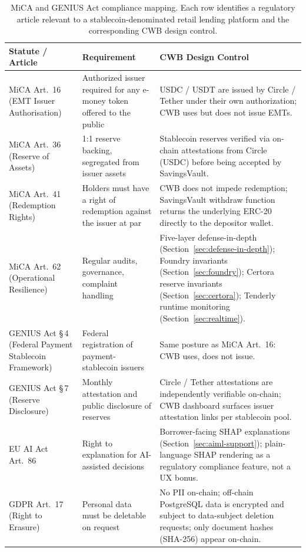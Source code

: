 \documentclass[12pt,a4paper]{report}
\begin{document}
\begin{table}[H]
\centering
\caption{MiCA and GENIUS Act compliance mapping. Each row identifies a regulatory article relevant to a stablecoin-denominated retail lending platform and the corresponding CWB design control.}
\label{tab:mica-mapping}
\small
\begin{tabular}{p{3.2cm}p{4.6cm}p{5.8cm}}
\hline
\textbf{Statute / Article} & \textbf{Requirement} & \textbf{CWB Design Control} \\
\hline
MiCA Art.~16 (EMT Issuer Authorisation) & Authorized issuer required for any e-money token offered to the public & USDC / USDT are issued by Circle / Tether under their own authorization; CWB uses but does not issue EMTs. \\
\hline
MiCA Art.~36 (Reserve of Assets) & 1{:}1 reserve backing, segregated from issuer assets & Stablecoin reserves verified via on-chain attestations from Circle (USDC) before being accepted by SavingsVault. \\
\hline
MiCA Art.~41 (Redemption Rights) & Holders must have a right of redemption against the issuer at par & CWB does not impede redemption; SavingsVault withdraw function returns the underlying ERC-20 directly to the depositor wallet. \\
\hline
MiCA Art.~62 (Operational Resilience) & Regular audits, governance, complaint handling & Five-layer defense-in-depth (Section~\ref{sec:defense-in-depth}); Foundry invariants (Section~\ref{sec:foundry}); Certora reserve invariants (Section~\ref{sec:certora}); Tenderly runtime monitoring (Section~\ref{sec:realtime}). \\
\hline
GENIUS Act \S\,4 (Federal Payment Stablecoin Framework) & Federal registration of payment-stablecoin issuers & Same posture as MiCA Art.~16: CWB uses, does not issue. \\
\hline
GENIUS Act \S\,7 (Reserve Disclosure) & Monthly attestation and public disclosure of reserves & Circle / Tether attestations are independently verifiable on-chain; CWB dashboard surfaces issuer attestation links per stablecoin pool. \\
\hline
EU AI Act Art.~86 & Right to explanation for AI-assisted decisions & Borrower-facing SHAP explanations (Section~\ref{sec:aiml-support}); plain-language SHAP rendering as a regulatory compliance feature, not a UX bonus. \\
\hline
GDPR Art.~17 (Right to Erasure) & Personal data must be deletable on request & No PII on-chain; off-chain PostgreSQL data is encrypted and subject to data-subject deletion requests; only document hashes (SHA-256) appear on-chain. \\
\hline
\end{tabular}
\end{table}
\end{document}
